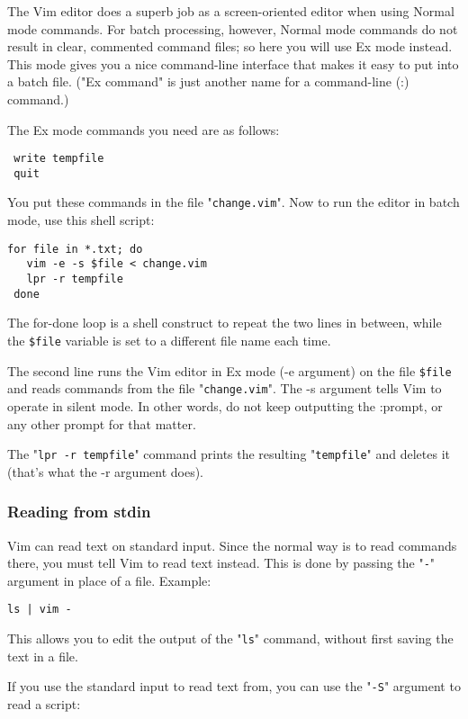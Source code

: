 The Vim editor does a superb job as a screen-oriented editor when using Normal mode commands.
For batch processing, however, Normal mode commands do not result in clear, commented command files; so here you will use Ex mode instead.
This mode gives you a nice command-line interface that makes it easy to put into a batch file.
("Ex command" is just another name for a command-line (:) command.)

The Ex mode commands you need are as follows:

\begin{Verbatim}[samepage=true]
 %s/-person-/Jones/g
 write tempfile
 quit
\end{Verbatim}

You put these commands in the file "\texttt{change.vim}".
Now to run the editor in batch mode, use this shell script:

\begin{Verbatim}[samepage=true]
 for file in *.txt; do
   vim -e -s $file < change.vim
   lpr -r tempfile
 done
\end{Verbatim}

The for-done loop is a shell construct to repeat the two lines in between, while the \texttt{\$file} variable is set to a different file name each time.

The second line runs the Vim editor in Ex mode (-e argument) on the file \texttt{\$file} and reads commands from the file "\texttt{change.vim}".
The -s argument tells Vim to operate in silent mode.
In other words, do not keep outputting the :prompt, or any other prompt for that matter.

The "\texttt{lpr -r tempfile}" command prints the resulting "\texttt{tempfile}" and deletes it (that's what the -r argument does).
\subsubsection{Reading from stdin}
Vim can read text on standard input.
Since the normal way is to read commands there, you must tell Vim to read text instead.
This is done by passing the "\texttt{-}" argument in place of a file.
Example:

\begin{Verbatim}[samepage=true]
 ls | vim -
\end{Verbatim}

This allows you to edit the output of the "\texttt{ls}" command, without first saving the text in a file.

If you use the standard input to read text from, you can use the "\texttt{-S}" argument to read a script:

